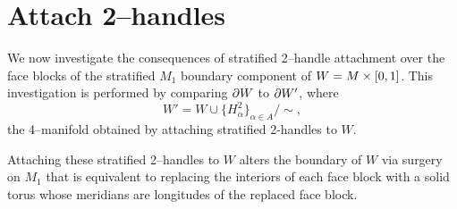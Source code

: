 \section{Attach 2--handles}

We now investigate the consequences of stratified 2--handle attachment over the face blocks of the stratified $M_1$ boundary component of $W=M\times[0,1]$.
This investigation is performed by comparing $\partial W$ to $\partial W'$, where
\[
	W' = W\cup\{H_\alpha^2\}_{\alpha\in A} / \sim,
\]
the 4--manifold obtained by attaching stratified 2-handles to $W$.

Attaching these stratified 2--handles to $W$ alters the boundary of $W$ via surgery on $M_1$ that is equivalent to replacing the interiors of each face block with a solid torus whose meridians are longitudes of the replaced face block.
